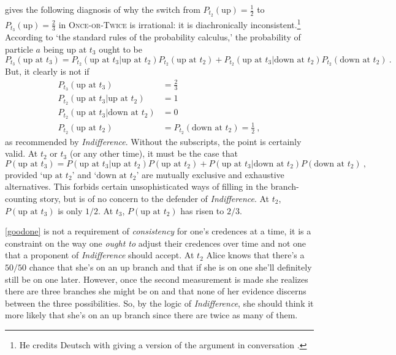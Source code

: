 \documentclass[onecolumn,secnumarabic,amsmath,amssymb,balancelastpage,nofootinbib]{article}
\begin{document}
\citet[]{wallace2012} gives the following diagnosis of why the switch from $P_{t_2}(\text{up})=\frac{1}{2}$ to $P_{t_3}(\text{up})=\frac{2}{3}$ in \textsc{Once-or-Twice} is irrational: it is diachronically inconsistent.\footnote{He credits Deutsch with giving a version of the argument in conversation \citep[][footnote 15]{wallace2013}.}  According to `the standard rules of the probability calculus,' the probability of particle $a$ being up at $t_3$ ought to be
\begin{equation}
P_{t_3}(\text{up at }t_3)=P_{t_2}(\text{up at }t_3|\text{up at }t_2)P_{t_2}(\text{up at }t_2)+P_{t_2}(\text{up at }t_3|\text{down at }t_2)P_{t_2}(\text{down at }t_2) \ .
\label{goodone}
\end{equation}
But, it clearly is not if
\begin{align}
P_{t_3}(\text{up at }t_3)&= \frac{2}{3}
\nonumber
\\
P_{t_2}(\text{up at }t_3|\text{up at }t_2)&= 1
\nonumber
\\
P_{t_2}(\text{up at }t_3|\text{down at }t_2)&= 0
\nonumber
\\
P_{t_2}(\text{up at }t_2)&= P_{t_2}(\text{down at }t_2)=\frac{1}{2}\ ,
\label{probs}
\end{align}
as recommended by \emph{Indifference}.  Without the subscripts, the point is certainly valid.  At $t_2$ or $t_3$ (or any other time), it must be the case that
\begin{equation}
P(\text{up at }t_3)=P(\text{up at }t_3|\text{up at }t_2)P(\text{up at }t_2)+P(\text{up at }t_3|\text{down at }t_2)P(\text{down at }t_2) \ ,
\end{equation}
provided `$\text{up at }t_2$' and `$\text{down at }t_2$' are mutually exclusive and exhaustive alternatives.  This forbids certain unsophisticated ways of filling in the branch-counting story, but is of no concern to the defender of \emph{Indifference}.  At $t_2$, $P(\text{up at }t_3)$ is only $1/2$. At $t_3$, $P(\text{up at }t_2)$ has risen to $2/3$.

\eqref{goodone} is not a requirement of \emph{consistency} for one's credences at a time, it is a constraint on the way one \emph{ought to} adjust their credences over time and not one that a proponent of \emph{Indifference} should accept.  At $t_2$ Alice knows that there's a $50/50$ chance that she's on an up branch and that if she is on one she'll definitely still be on one later.  However, once the second measurement is made she realizes there are three branches she might be on and that none of her evidence discerns between the three possibilities.  So, by the logic of \emph{Indifference}, she should think it more likely that she's on an up branch since there are twice as many of them.
\end{document}
